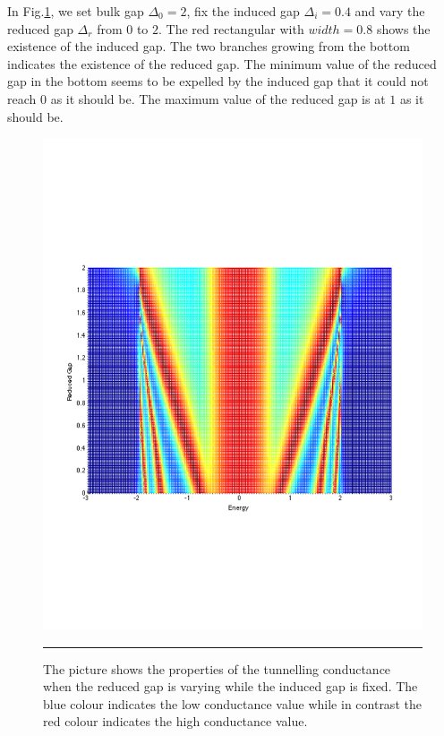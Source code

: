 In Fig.\ref{MapReduced}, we set bulk gap $\Delta_0=2$, fix the induced gap $\Delta_i=0.4$ and vary the reduced gap $\Delta_r$ from $0$ to $2$.  The red rectangular with $width=0.8$ shows the existence of the induced gap. The two branches growing from the bottom indicates the existence of the reduced gap. The minimum value of the reduced gap in the bottom seems to be expelled by the induced gap that it could not reach $0$ as it should be. The maximum value of the reduced gap is at $1$ as it should be.
\begin{figure}[htbp]
\small
	\centering
		\includegraphics[width=12cm]{./Figures/3dreduceinduce.pdf}
		\rule{35em}{0.5pt}
	\caption[An Electron]{The picture shows the properties of the tunnelling conductance when the reduced gap is varying while the induced gap is fixed. The blue colour indicates the low conductance value while in contrast the red colour indicates the high conductance value.}
	\label{MapReduced}
\end{figure}
